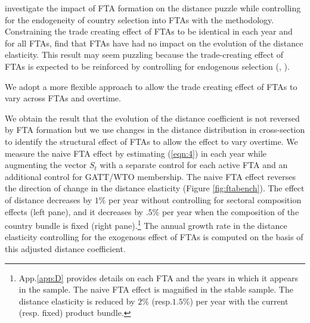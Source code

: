\documentclass[12pt,twoside,a4paper,notitlepage]{article}
\begin{document}
\cite{Bosquet2015} investigate the impact of FTA formation on the distance puzzle while controlling for the endogeneity of country selection into FTAs with the \cite{Baier2007} methodology.
Constraining the trade creating effect of FTAs to be identical in each year and for all FTAs, \cite{Bosquet2015} find that FTAs have had no impact on the evolution of the distance elasticity.
This result may seem puzzling because the trade-creating effect of FTAs is expected to be reinforced by controlling for endogenous selection (\cite{Baier2007}, \cite{Egger2011}).

We adopt a more flexible approach to allow the trade creating effect of FTAs to vary across FTAs and overtime.

We obtain the result that the evolution of the distance coefficient is not reversed by FTA formation but we use changes in the distance distribution in cross-section to identify the structural effect of FTAs to allow the effect to vary overtime.
We measure the naive FTA effect by estimating (\ref{eqn:4}) in each year while augmenting the vector $S_t$ with a separate control for each active FTA and an additional control for GATT/WTO membership.
The naive FTA effect reverses the direction of change in the distance elasticity (Figure \ref{fig:ftabench}).
The effect of distance decreases by $1$\% per year without controlling for sectoral composition effects (left pane), and it decreases by $.5$\% per year when the composition of the country bundle is fixed (right pane).\footnote{App.\ref{app:D} provides details on each FTA and the years in which it appears in the sample.
The naive FTA effect is magnified in the stable sample.
The distance elasticity is reduced by $2$\% (resp.$1.5$\%) per year with the current (resp.
fixed) product bundle.}
The annual growth rate in the distance elasticity controlling for the exogenous effect of FTAs is computed on the basis of this adjusted distance coefficient.
\end{document}
